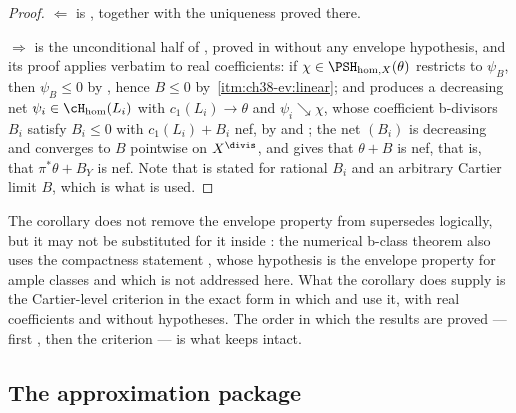 \begin{proof}
$\Leftarrow$ is , together with the
uniqueness proved there.

$\Rightarrow$ is the unconditional half of
, proved in
 without any envelope hypothesis, and
its proof applies verbatim to real coefficients: if
$\chi\in\PSH_{\mathrm{hom},X}(\theta)$ restricts to $\psi_B$, then
$\psi_B\leq0$ by , hence
$B\leq0$ by
\,\cref{itm:ch38-ev:linear}; and
 produces a decreasing net
$\psi_i\in\cH_{\mathrm{hom}}(L_i)$ with $c_1(L_i)\to\theta$ and
$\psi_i\searrow\chi$, whose coefficient b-divisors $B_i$ satisfy
$B_i\leq0$ with $c_1(L_i)+B_i$ nef, by
 and
; the net $(B_i)$ is decreasing and
converges to $B$ pointwise on $X^{\divis}$, and
 gives that $\theta+B$ is nef, that is, that
$\pi^*\theta+B_Y$ is nef.  Note that
 is stated for rational $B_i$ and an arbitrary
Cartier limit $B$, which is what is used.
\end{proof}

\begin{warning}{The corollary does not remove the envelope property from
}
\label{warn:ch38-criterion-scope}
 supersedes
 logically, but it may not be
substituted for it inside
: the numerical b-class theorem
 also uses the compactness
statement \cite[Corollary~6.22]{BJ22}, whose hypothesis is the envelope
property for ample classes and which is not addressed here.  What the
corollary does supply is the Cartier-level criterion in the exact form in
which  and
 use it, with real coefficients and
without hypotheses.  The order in which the results are proved --- first
, then the criterion --- is what
keeps  intact.
\end{warning}

\subsection{The approximation package}
\label{sec:ch38-approximation-package}

